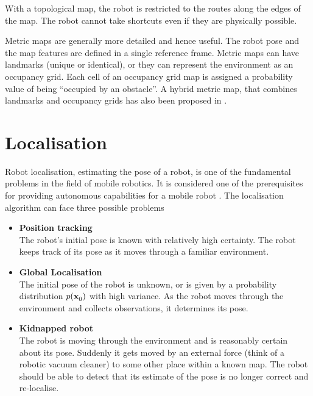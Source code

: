 With a topological map, the robot is restricted to the routes along
the edges of the map. The robot cannot take shortcuts even if they are
physically possible. 


Metric maps are generally more detailed and hence useful. 
The robot pose and the map features are defined in a single
reference frame. Metric maps can have landmarks (unique or identical),
or they can represent the environment as an occupancy grid. Each cell
of an occupancy grid map is assigned a probability value of being
``occupied by an obstacle''. A hybrid metric map, that combines
landmarks and occupancy grids has also been proposed in
\cite{guivant04}.  



\section{Localisation} 
\label{sec:Localisation}


Robot localisation, estimating the pose of a robot, is one of the
fundamental problems in the field of mobile robotics. It is considered
one of the prerequisites for providing autonomous capabilities for a
mobile robot \cite{Cox91}.  The localisation algorithm can face three
possible problems

\begin{itemize}
\item {\bf Position tracking}\\
      The robot's initial pose is known with relatively high
      certainty. The robot keeps track of its pose as it moves through a
      familiar environment.

\item {\bf Global Localisation}\\ 
      The initial pose of the robot is unknown, or is given by a
      probability distribution $p(\x{0}{}{})$ with high variance. As
      the robot moves through the environment and collects
      observations, it determines its pose.

\item {\bf Kidnapped robot}\\ 
The robot is moving through the environment and is reasonably certain
about its pose. Suddenly it gets moved by an external force (think of
a robotic vacuum cleaner) to some other place within a known map. The
robot should be able to detect that its estimate of the pose is no
longer correct and re-localise.
\end{itemize}

